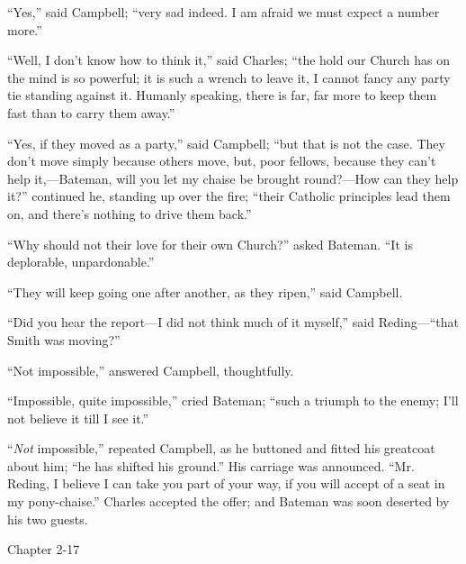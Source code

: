 ``Yes,'' said Campbell; ``very sad indeed. I am afraid
we must expect a number more.''

``Well, I don't know how to think it,'' said Charles;
``the hold our Church has on the mind is so powerful; it is such a
wrench to leave it, I cannot fancy any party tie standing against it.
Humanly speaking, there is far, far more to keep them fast than to
carry them away.''

``Yes, if they moved as a party,'' said Campbell; ``but
that is not the case. They don't move simply because others move, but,
poor fellows, because they can't help it,—Bateman, will you let my
chaise be brought round?—How can they help it?'' continued he,
standing up over the fire; ``their Catholic principles lead them
on, and there's nothing to drive them back.''

``Why should not their love for their own Church?'' asked
Bateman. ``It is deplorable, unpardonable.''

``They will keep going one after another, as they ripen,''
said Campbell.

``Did you hear the report—I did not think much of it
myself,'' said Reding—``that Smith was moving?''

``Not impossible,'' answered Campbell, thoughtfully.

``Impossible, quite impossible,'' cried Bateman; ``such
a triumph to the enemy; I'll not believe it till I see it.''

``\emph{Not} impossible,'' repeated Campbell, as he
buttoned and fitted his greatcoat about him; ``he has shifted his
ground.'' His carriage was announced. ``Mr. Reding, I
believe I can take you part of your way, if you will accept of a seat
in my pony-chaise.'' Charles accepted the offer; and Bateman was
soon deserted by his two guests.

Chapter 2-17


